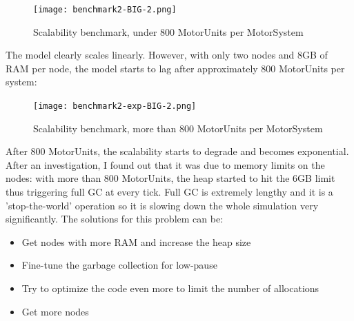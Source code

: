 \documentclass[titlepage]{article}
\begin{document}
\begin{figure}[H]
  \hspace*{-3cm}
  \texttt{[image: benchmark2-BIG-2.png]}
  \caption{Scalability benchmark, under 800 MotorUnits per MotorSystem}
  \label{fig:benchmark2}
\end{figure}
The model clearly scales linearly. However, with only two nodes and 8GB of RAM per node, the model starts to lag after approximately 800 MotorUnits per system:
\begin{figure}[H]
  \hspace*{-3cm}
  \texttt{[image: benchmark2-exp-BIG-2.png]}
  \caption{Scalability benchmark, more than 800 MotorUnits per MotorSystem}
  \label{fig:benchmark2-exp}
\end{figure}
After 800 MotorUnits, the scalability starts to degrade and becomes exponential. After an investigation, I found out that it was due to memory limits on the nodes: with more than 800 MotorUnits, the heap started to hit the 6GB limit thus triggering full GC at every tick. Full GC is extremely lengthy and it is a 'stop-the-world' operation so it is slowing down the whole simulation very significantly. The solutions for this problem can be:
\begin{itemize}
\item Get nodes with more RAM and increase the heap size
\item Fine-tune the garbage collection for low-pause
\item Try to optimize the code even more to limit the number of allocations
\item Get more nodes
\end{itemize}
\end{document}
